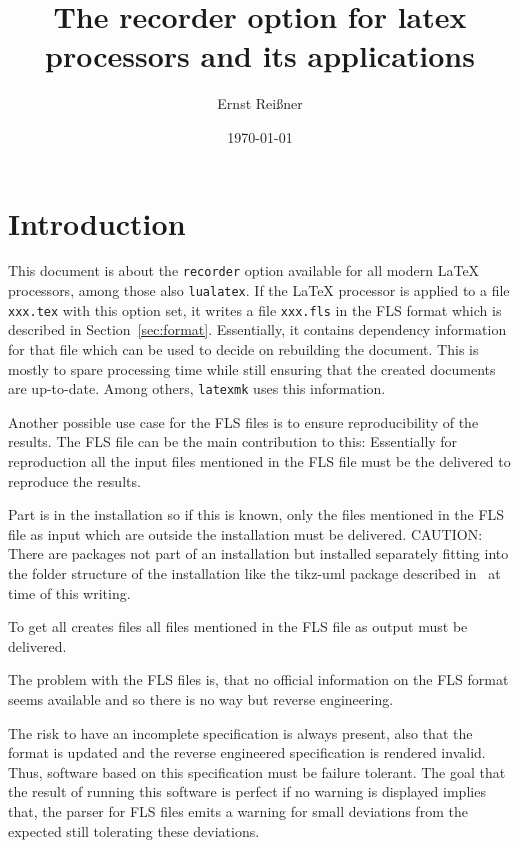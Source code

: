 \documentclass[a4paper, english]{article}%
\title{The recorder option for latex processors and its applications}
\author{Ernst Reißner}
\date{\today}
\begin{document}
\maketitle
\tableofcontents

\section{Introduction}\label{sec:intro}

This document is about the \texttt{recorder} option available for all modern \LaTeX{} processors, 
among those also \texttt{lualatex}. 
If the \LaTeX{} processor is applied to a file \texttt{xxx.tex} with this option set, 
it writes a file \texttt{xxx.fls} in the FLS format 
which is described in Section~\ref{sec:format}. 
Essentially, it contains dependency information for that file 
which can be used to decide on rebuilding the document. 
This is mostly to spare processing time 
while still ensuring that the created documents are up-to-date. 
Among others, \texttt{latexmk} uses this information. 

Another possible use case for the FLS files is to ensure reproducibility of the results. 
The FLS file can be the main contribution to this: 
Essentially for reproduction all the input files mentioned in the FLS file 
must be the delivered to reproduce the results. 

Part is in the installation so if this is known, 
only the files mentioned in the FLS file as input which are outside the installation must be delivered. 
CAUTION\@: There are packages not part of an installation 
but installed separately fitting into the folder structure of the installation 
like the tikz-uml package described in~\cite{tikzumlP} at time of this writing. 

To get all creates files all files mentioned in the FLS file as output must be delivered. 
\medskip


The problem with the FLS files is, 
that no official information on the FLS format seems available 
and so there is no way but reverse engineering. 

The risk to have an incomplete specification is always present, 
also that the format is updated and the reverse engineered specification is rendered invalid. 
Thus, software based on this specification must be failure tolerant. 
The goal that the result of running this software is perfect if no warning is displayed 
implies that, the parser for FLS files emits a warning for small deviations from the expected 
still tolerating these deviations. 
\end{document}
